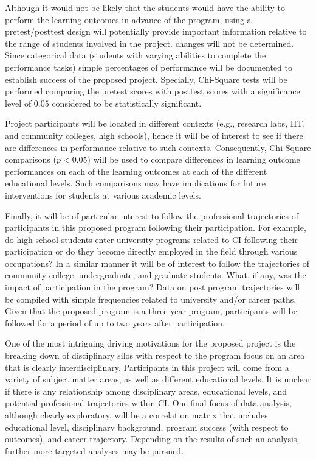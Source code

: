 \documentclass[11pt]{NSFamsart}
\begin{document}
Although it would not be likely that the students would have the ability to perform the learning outcomes in advance of the program, using a pretest/posttest design will potentially provide important information relative to the range of students involved in the project. changes will not be determined. Since categorical data (students with varying abilities to complete the performance tasks) simple percentages of performance will be documented to establish success of the proposed project. Specially, Chi-Square tests will be performed comparing the pretest scores with posttest scores with a significance level of $0.05$ considered to be statistically significant.

Project participants will be located in different contexts (e.g., research labs, IIT, and community colleges, high schools), hence it will be of interest to see if there are differences in performance relative to such contexts. Consequently, Chi-Square comparisons ($p<0.05$) will be used to compare differences in learning outcome performances on each of the learning outcomes at each of the different educational levels. Such comparisons may have implications for future interventions for students at various academic levels.

Finally, it will be of particular interest to follow the professional trajectories of participants in this proposed program following their participation. For example, do high school students enter university programs related to CI following their participation or do they become directly employed in the field through various occupations? In a similar manner it will be of interest to follow the trajectories of community college, undergraduate, and graduate students. What, if any, was the impact of participation in the program? Data on post program trajectories will be compiled with simple frequencies related to university and/or career paths. Given that the proposed program is a three year program, participants will be followed for a period of up to two years after participation.

One of the most intriguing driving motivations for the proposed project is the breaking down of disciplinary silos with respect to the program focus on an area that is clearly interdisciplinary. Participants in this project will come from a variety of subject matter areas, as well as different educational levels. It is unclear if there is any relationship among disciplinary areas, educational levels, and potential professional trajectories within CI. One final focus of data analysis, although clearly exploratory, will be a correlation matrix that includes educational level, disciplinary background, program success (with respect to outcomes), and career trajectory. Depending on the results of such an analysis, further more targeted analyses may be pursued.
\end{document}
